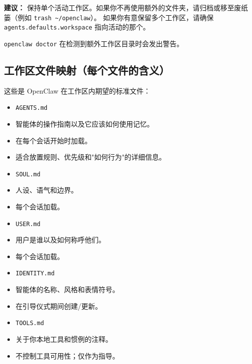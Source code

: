 \textbf{建议：} 保持单个活动工作区。如果你不再使用额外的文件夹，请归档或移至废纸篓（例如 \texttt{trash \textasciitilde{}/openclaw}）。
如果你有意保留多个工作区，请确保 \texttt{agents.defaults.workspace} 指向活动的那个。

\texttt{openclaw doctor} 在检测到额外工作区目录时会发出警告。

\subsection{工作区文件映射（每个文件的含义）}


这些是 OpenClaw 在工作区内期望的标准文件：

\begin{itemize}
  \item \texttt{AGENTS.md}
  \item 智能体的操作指南以及它应该如何使用记忆。
  \item 在每个会话开始时加载。
  \item 适合放置规则、优先级和"如何行为"的详细信息。
\end{itemize}


\begin{itemize}
  \item \texttt{SOUL.md}
  \item 人设、语气和边界。
  \item 每个会话加载。
\end{itemize}


\begin{itemize}
  \item \texttt{USER.md}
  \item 用户是谁以及如何称呼他们。
  \item 每个会话加载。
\end{itemize}


\begin{itemize}
  \item \texttt{IDENTITY.md}
  \item 智能体的名称、风格和表情符号。
  \item 在引导仪式期间创建/更新。
\end{itemize}


\begin{itemize}
  \item \texttt{TOOLS.md}
  \item 关于你本地工具和惯例的注释。
  \item 不控制工具可用性；仅作为指导。
\end{itemize}


